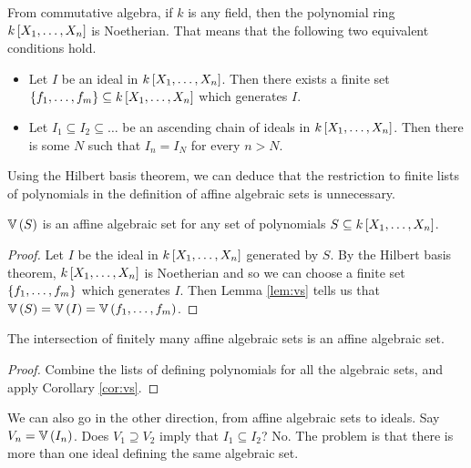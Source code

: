 \pagebreak

\begin{theorem}
From commutative algebra, if $ k $ is any field, then the polynomial ring $ k\sbr{X_1, \dots, X_n} $ is Noetherian. That means that the following two equivalent conditions hold.
\begin{itemize}
\item Let $ I $ be an ideal in $ k\sbr{X_1, \dots, X_n} $. Then there exists a finite set $ \cbr{f_1, \dots, f_m} \subseteq k\sbr{X_1, \dots, X_n} $ which generates $ I $.
\item Let $ I_1 \subseteq I_2 \subseteq \dots $ be an ascending chain of ideals in $ k\sbr{X_1, \dots, X_n} $. Then there is some $ N $ such that $ I_n = I_N $ for every $ n > N $.
\end{itemize}
\end{theorem}

Using the Hilbert basis theorem, we can deduce that the restriction to finite lists of polynomials in the definition of affine algebraic sets is unnecessary.

\begin{corollary}
\label{cor:vs}
$ \VV\br{S} $ is an affine algebraic set for any set of polynomials $ S \subseteq k\sbr{X_1, \dots, X_n} $.
\end{corollary}

\begin{proof}
Let $ I $ be the ideal in $ k\sbr{X_1, \dots, X_n} $ generated by $ S $. By the Hilbert basis theorem, $ k\sbr{X_1, \dots, X_n} $ is Noetherian and so we can choose a finite set $ \cbr{f_1, \dots, f_m} $ which generates $ I $. Then Lemma \ref{lem:vs} tells us that $ \VV\br{S} = \VV\br{I} = \VV\br{f_1, \dots, f_m} $.
\end{proof}

\begin{corollary}
The intersection of finitely many affine algebraic sets is an affine algebraic set.
\end{corollary}

\begin{proof}
Combine the lists of defining polynomials for all the algebraic sets, and apply Corollary \ref{cor:vs}.
\end{proof}

We can also go in the other direction, from affine algebraic sets to ideals. Say $ V_n = \VV\br{I_n} $. Does $ V_1 \supseteq V_2 $ imply that $ I_1 \subseteq I_2 $? No. The problem is that there is more than one ideal defining the same algebraic set.

